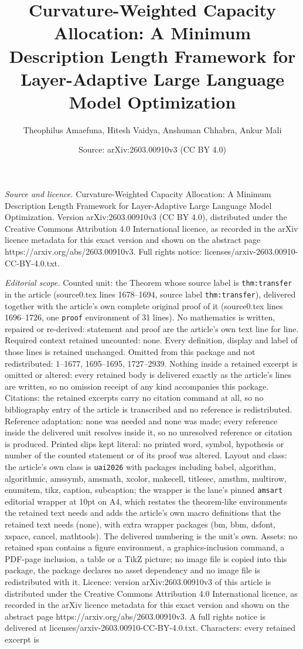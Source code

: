 \documentclass[10pt,a4paper]{amsart}
\title[Curvature-Weighted Capacity Allocation: A Minimum Descriptio]{Curvature-Weighted Capacity Allocation: A Minimum Description Length Framework for Layer-Adaptive Large Language Model Optimization}
\author{Theophilus Amaefuna, Hitesh Vaidya, Anshuman Chhabra, Ankur Mali}
\date{Source: arXiv:2603.00910v3 (CC BY 4.0)}
\begin{document}
\maketitle

\noindent\emph{Source and licence.} Curvature-Weighted Capacity Allocation: A Minimum Description Length Framework for Layer-Adaptive Large Language Model Optimization. Version arXiv:2603.00910v3 (CC BY 4.0), distributed under the Creative Commons Attribution 4.0 International licence, as recorded in the arXiv licence metadata for this exact version and shown on the abstract page https://arxiv.org/abs/2603.00910v3. Full rights notice: licenses/arxiv-2603.00910-CC-BY-4.0.txt.\par\smallskip

\noindent\textit{Editorial scope.} Counted unit: the Theorem whose source label is \texttt{thm:transfer} in the article (source0.tex lines 1678--1694, source label \texttt{thm:transfer}), delivered together with the article's own complete original proof of it (source0.tex lines 1696--1726, one \texttt{proof} environment of 31 lines). No mathematics is written, repaired or re-derived: statement and proof are the article's own text line for line. Required context retained uncounted: none. Every definition, display and label of those lines is retained unchanged. Omitted from this package and not redistributed: 1--1677, 1695--1695, 1727--2939. Nothing inside a retained excerpt is omitted or altered: every retained body is delivered exactly as the article's lines are written, so no omission receipt of any kind accompanies this package. Citations: the retained excerpts carry no citation command at all, so no bibliography entry of the article is transcribed and no reference is redistributed. Reference adaptation: none was needed and none was made; every reference inside the delivered unit resolves inside it, so no unresolved reference or citation is produced. Printed slips kept literal: no printed word, symbol, hypothesis or number of the counted statement or of its proof was altered. Layout and class: the article's own class is \texttt{uai2026} with packages including babel, algorithm, algorithmic, amssymb, amsmath, xcolor, makecell, titlesec, amsthm, multirow, enumitem, tikz, caption, subcaption; the wrapper is the lane's pinned \texttt{amsart} editorial wrapper at 10pt on A4, which restates the theorem-like environments the retained text needs and adds the article's own macro definitions that the retained text needs (none), with extra wrapper packages (bm, bbm, dsfont, xspace, cancel, mathtools). The delivered numbering is the unit's own. Assets: no retained span contains a figure environment, a graphics-inclusion command, a PDF-page inclusion, a table or a TikZ picture; no image file is copied into this package, the package declares no asset dependency and no image file is redistributed with it. Licence: version arXiv:2603.00910v3 of this article is distributed under the Creative Commons Attribution 4.0 International licence, as recorded in the arXiv licence metadata for this exact version and shown on the abstract page https://arxiv.org/abs/2603.00910v3. A full rights notice is delivered at licenses/arxiv-2603.00910-CC-BY-4.0.txt. Characters: every retained excerpt is 
\end{document}

